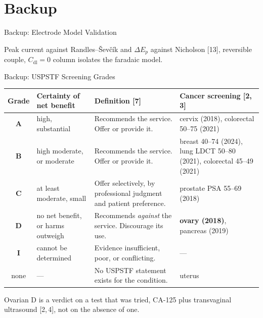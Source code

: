 \documentclass[10pt, aspectratio=169]{beamer}
\begin{document}
\section*{Backup}


\begin{frame}{Backup: Electrode Model Validation}
\centering{}
\vspace{0.2cm}

{\footnotesize Peak current against Randles--\v{S}ev\v{c}\'ik and $\Delta E_p$ against Nicholson [13], reversible couple, $C_{\mathrm{dl}} = 0$ column isolates the faradaic model.}
\end{frame}

\begin{frame}{Backup: USPSTF Screening Grades}
\centering
{\footnotesize
\begin{tabular}{@{}c>{\raggedright\arraybackslash}p{2.8cm}>{\raggedright\arraybackslash}p{4.7cm}>{\raggedright\arraybackslash}p{3.8cm}@{}}
\toprule
Grade & Certainty of net benefit & Definition [7] & Cancer screening [2,\,3] \\
\midrule
\textbf{A} & high, substantial          & Recommends the service. Offer or provide it.        & cervix (2018), colorectal 50--75 (2021) \\
\textbf{B} & high moderate, or moderate & Recommends the service. Offer or provide it.        & breast 40--74 (2024), lung LDCT 50--80 (2021), colorectal 45--49 (2021) \\
\textbf{C} & at least moderate, small   & Offer selectively, by professional judgment and patient preference. & prostate PSA 55--69 (2018) \\
\textbf{D} & no net benefit, or harms outweigh & Recommends \emph{against} the service. Discourage its use. & \textbf{ovary (2018)}, pancreas (2019) \\
\textbf{I} & cannot be determined       & Evidence insufficient, poor, or conflicting.        & --- \\
none & ---                              & No USPSTF statement exists for the condition.       & uterus \\
\bottomrule
\end{tabular}}
\vspace{0.3cm}

{\small Ovarian D is a verdict on a test that was tried, CA-125 plus transvaginal ultrasound [2,\,4], not on the absence of one.}
\vspace{0.05cm}
\end{frame}
\end{document}
